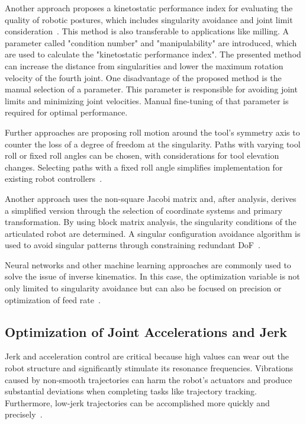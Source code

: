 Another approach proposes a kinetostatic performance index for evaluating the quality of robotic postures, which includes singularity avoidance and joint limit consideration~\cite{Huo.2008}. This method is also transferable to applications like milling. A parameter called "condition number" and "manipulability" are introduced, which are used to calculate the "kinetostatic performance index". The presented method can increase the distance from singularities and lower the maximum rotation velocity of the fourth joint. One disadvantage of the proposed method is the manual selection of a parameter. This parameter is responsible for avoiding joint limits and minimizing joint velocities. Manual fine-tuning of that parameter is required for optimal performance. 

Further approaches are proposing roll motion around the tool's symmetry axis to counter the loss of a degree of freedom at the singularity. Paths with varying tool roll or fixed roll angles can be chosen, with considerations for tool elevation changes. Selecting paths with a fixed roll angle simplifies implementation for existing robot controllers~\cite{Milenkovic.2021}.

Another approach uses the non-square Jacobi matrix and, after analysis, derives a simplified version through the selection of coordinate systems and primary transformation. By using block matrix analysis, the singularity conditions of the articulated robot are determined.
A singular configuration avoidance algorithm is used to avoid singular patterns through constraining redundant DoF~\cite{Shi.2021}.

Neural networks and other machine learning approaches are commonly used to solve the issue of inverse kinematics. In this case, the optimization variable is not only limited to singularity avoidance but can also be focused on precision or optimization of feed rate~\cite{Wei.2014}.

\subsection{Optimization of Joint Accelerations and Jerk}

Jerk and acceleration control are critical because high values can wear out the robot structure and significantly stimulate its resonance frequencies. Vibrations caused by non-smooth trajectories can harm the robot's actuators and produce substantial deviations when completing tasks like trajectory tracking. Furthermore, low-jerk trajectories can be accomplished more quickly and precisely~\cite{Gasparetto.2010}.

